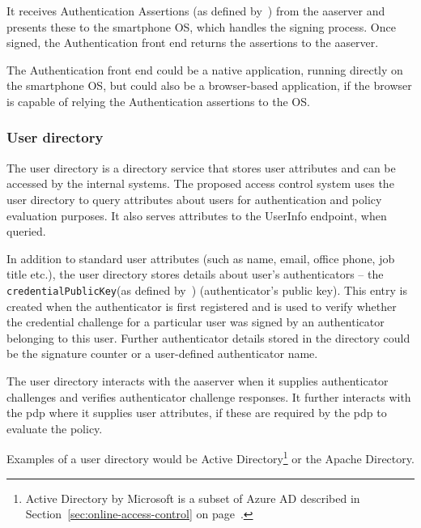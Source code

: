 It receives Authentication Assertions (as defined by~\cite{Balfanz2019Web1}) from the \acrshort{aaserver} and presents these to the smartphone OS, which handles the signing process. Once signed, the Authentication front end returns the assertions to the \acrshort{aaserver}.

The Authentication front end could be a native application, running directly on the smartphone OS, but could also be a browser-based application, if the browser is capable of relying the Authentication assertions to the OS\footnotemark.
% 

\subsubsection{User directory}
The user directory is a directory service that stores user attributes and can be accessed by the internal systems. The proposed access control system uses the user directory to query attributes about users for authentication and policy evaluation purposes. It also serves attributes to the UserInfo endpoint, when queried.

In addition to standard user attributes (such as name, email, office phone, job title etc.), the user directory stores details about user's authenticators -- the \texttt{credentialPublicKey}(as defined by~\cite{Balfanz2019Web1}) (authenticator's public key). This entry is created when the authenticator is first registered and is used to verify whether the credential challenge for a particular user was signed by an authenticator belonging to this user. Further authenticator details stored in the directory could be the signature counter or a user-defined authenticator name.

The user directory interacts with the \acrshort{aaserver} when it supplies authenticator challenges and verifies authenticator challenge responses. It further interacts with the \acrshort{pdp} where it supplies user attributes, if these are required by the \acrshort{pdp} to evaluate the policy.

Examples of a user directory would be Active Directory\footnote{Active Directory by Microsoft is a subset of Azure AD described in Section~\ref{sec:online-access-control} on page~\pageref{sec:online-access-control}.} or the Apache Directory\footnotemark.
% 
    
